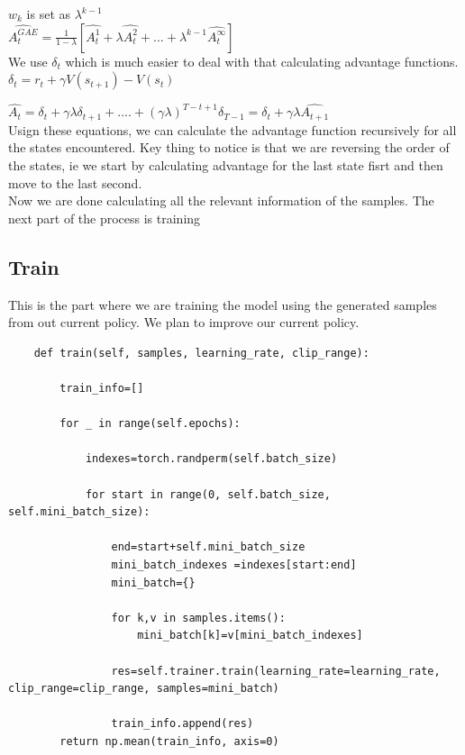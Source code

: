 \documentclass[12pt]{extarticle}
\begin{document}
$w_k$ is set as $\lambda^{k-1}$\\
$\hat{A_t^{GAE}}=\frac{1}{1-\lambda}[\hat{A_t^{1}} + \lambda \hat{A_t^{2}}+...+\lambda^{k-1} \hat{A_t^{\infty}}] $\\
\newline
We use $\delta_t$ which is much easier to deal with that calculating advantage functions. \\

$\delta_t=r_t+\gamma V(s_{t+1})-V(s_t)$


$\hat{A_t} = \delta_t+ \gamma \lambda \delta_{t+1}+ ....+ (\gamma \lambda)^{T-t+1}\delta_{T-1} =\delta_t+ \gamma \lambda \hat{A_{t+1}}$\\
\newline
Usign these equations, we can calculate the advantage function recursively for all the states encountered. Key thing to notice is that we are reversing the order of the states, ie we start by calculating advantage for the last state fisrt and then move to the last second. \\
\newline
Now we are done calculating all the relevant information of the samples. 
\newline
The next part of the process is training

\subsection{Train}
This is the part where we are training the model using the generated samples from out current policy. We plan to improve our current policy. 

\begin{lstlisting}
	def train(self, samples, learning_rate, clip_range):

		train_info=[]

		for _ in range(self.epochs):

			indexes=torch.randperm(self.batch_size)

			for start in range(0, self.batch_size, self.mini_batch_size):

				end=start+self.mini_batch_size
				mini_batch_indexes =indexes[start:end]
				mini_batch={}

				for k,v in samples.items():
					mini_batch[k]=v[mini_batch_indexes]

				res=self.trainer.train(learning_rate=learning_rate, 		    clip_range=clip_range, samples=mini_batch)

				train_info.append(res)
		return np.mean(train_info, axis=0)
\end{lstlisting}
\end{document}
